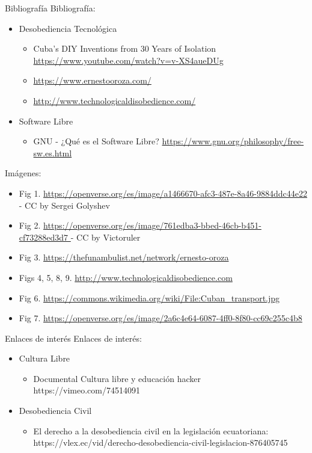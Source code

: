 \documentclass[spanish]{beamer}
\begin{document}
\begin{frame}{Bibliografía}
    Bibliografía:    
    \begin{itemize}
        \item Desobediencia Tecnológica
        \begin{itemize}\footnotesize         
            \item Cuba's DIY Inventions from 30 Years of Isolation \url{https://www.youtube.com/watch?v=v-XS4aueDUg}
            \item \url{https://www.ernestooroza.com/}
            \item \url{http://www.technologicaldisobedience.com/}
        \end{itemize}
        \item Software Libre  
        \begin{itemize}\footnotesize
            \item GNU - ¿Qué es el Software Libre? \url{https://www.gnu.org/philosophy/free-sw.es.html}
        \end{itemize}      
    \end{itemize}

    Imágenes:     
    \begin{itemize}\tiny
        \item Fig 1. \url{https://openverse.org/es/image/a1466670-afc3-487e-8a46-9884ddc44e22 } - CC by Sergei Golyshev
        \item Fig 2. \url{https://openverse.org/es/image/761edba3-bbed-46cb-b451-cf73288ed3d7 } - CC by Victoruler
        \item Fig 3. \url{https://thefunambulist.net/network/ernesto-oroza}
        \item Figs 4, 5, 8, 9. \url{http://www.technologicaldisobedience.com}
        \item Fig 6. \url{https://commons.wikimedia.org/wiki/File:Cuban_transport.jpg}
        \item Fig 7. \url{https://openverse.org/es/image/2a6c4e64-6087-4ff0-8f80-cc69c255c4b8}
    \end{itemize}
\end{frame}

\begin{frame}{Enlaces de interés}
    Enlaces de interés:    
    \begin{itemize}
        \item Cultura Libre  
        \begin{itemize}            
            \item Documental Cultura libre y educación hacker https://vimeo.com/74514091
        \end{itemize}      
        \item Desobediencia Civil
        \begin{itemize}
            \item El derecho a la desobediencia civil en la legislación ecuatoriana:
            https://vlex.ec/vid/derecho-desobediencia-civil-legislacion-876405745
        \end{itemize}
    \end{itemize}    
\end{frame}
\end{document}
